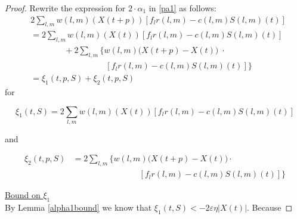 \begin{proof}
Rewrite the expression for $2\cdot \alpha_1$ in \eqref{pa1} as follows:
\begin{align} \nonumber 
&2\sum_{l,m} w(l,m)(X(t + p)) [f_{l}  r(l,m) -  c(l,m)S(l,m)(t) ]     \\ \nonumber
&=  2\sum_{l,m} w(l,m)(X(t )) [f_{l}r(l,m) - c(l,m)S(l,m)(t) ]  \\ \nonumber
& \qquad  \qquad + 2\sum_{l,m} \Big\{w(l,m) \Big( X(t + p) - X(t) \Big)\; \cdot  \\ 
& \qquad \qquad \qquad \qquad \quad [f_{l}r(l,m) - c(l,m)S(l,m)(t) ] \Big\} \\  \nonumber
&=  \xi_{1} (t,p,S)+  \xi_{2} (t,p,S)
\label{2terms}
\end{align}
for
\begin{small}
\begin{equation*} 
\xi_{1} (t,S) = 2\sum_{l,m} w(l,m)(X(t)) [f_{l}r(l,m) - c(l,m)S(l,m)(t) ]  
\end{equation*}
\end{small} and
\begin{small}
\begin{align*}
\xi_{2} (t,p,S) &= 2\sum_{l,m} \Big\{w(l,m) \Big( X(t + p) - X(t) \Big) \cdot  \\  \nonumber
& \qquad \qquad \qquad \qquad [f_{l}r(l,m) - c(l,m)S(l,m)(t) ] \Big\} 
\end{align*}
\end{small}\underline{Bound on $\xi_{1}$} \\
By Lemma \ref{alpha1bound} we know that 
$
\xi_1(t,S) < -2\varepsilon \eta \vert X(t) \vert
$. Because

\end{proof}
